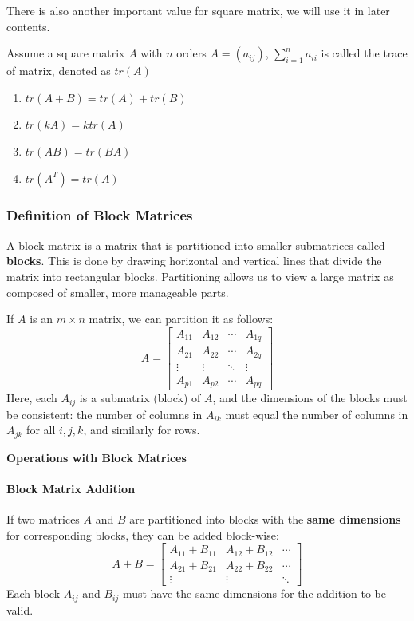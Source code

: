 \documentclass[oneside]{book}
\begin{document}
There is also another important value for square matrix, we will use it in later contents.

\begin{definition}
Assume a square matrix $A$ with $n$ orders $A=(a_{ij})$, $\sum_{i=1}^{n} a_{ii}$ is called the trace of matrix, denoted as $tr(A)$
\end{definition}

\begin{property}
\begin{enumerate}
    \item $tr(A+B) = tr(A) + tr(B)$
    \item $tr(kA) = k tr(A)$
    \item $tr(AB) = tr(BA)$
    \item $tr(A^T) = tr(A)$
\end{enumerate}
\end{property}

\subsubsection*{Definition of Block Matrices}
A block matrix is a matrix that is partitioned into smaller submatrices called \textbf{blocks}. This is done by drawing horizontal and vertical lines that divide the matrix into rectangular blocks. Partitioning allows us to view a large matrix as composed of smaller, more manageable parts.

If \( A \) is an \( m \times n \) matrix, we can partition it as follows:
\[
A = \begin{bmatrix}
    A_{11} & A_{12} & \cdots & A_{1q} \\
    A_{21} & A_{22} & \cdots & A_{2q} \\
    \vdots & \vdots & \ddots & \vdots \\
    A_{p1} & A_{p2} & \cdots & A_{pq}
\end{bmatrix}
\]
Here, each \( A_{ij} \) is a submatrix (block) of \( A \), and the dimensions of the blocks must be consistent: the number of columns in \( A_{ik} \) must equal the number of columns in \( A_{jk} \) for all \( i, j, k \), and similarly for rows.

\textbf{Operations with Block Matrices}

\paragraph*{Block Matrix Addition}
If two matrices \( A \) and \( B \) are partitioned into blocks with the \textbf{same dimensions} for corresponding blocks, they can be added block-wise:
\[
A + B = \begin{bmatrix}
    A_{11} + B_{11} & A_{12} + B_{12} & \cdots \\
    A_{21} + B_{21} & A_{22} + B_{22} & \cdots \\
    \vdots & \vdots & \ddots
\end{bmatrix}
\]
Each block \( A_{ij} \) and \( B_{ij} \) must have the same dimensions for the addition to be valid.
\end{document}
